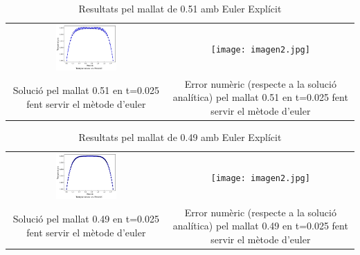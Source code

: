 \documentclass{article}
\begin{document}
\begin{table}[h]
    \centering
    \caption{Resultats pel mallat de 0.51 amb Euler Explícit}
    \label{tab:euler_at1}
    \begin{tabular}{cc}
        \includegraphics[width=0.4\textwidth]{images/T_vs_z_at1.png} &
        \texttt{[image: imagen2.jpg]} \\
        
        \parbox{0.4\textwidth}{\centering Solució pel mallat 0.51 en t=0.025 fent servir el mètode d'euler} &
        \parbox{0.4\textwidth}{\centering Error numèric (respecte a la solució analítica) pel mallat 0.51 en t=0.025 fent servir el mètode d'euler} \\
 
    \end{tabular}
\end{table}
\begin{table}[h]
    \centering
    \caption{Resultats pel mallat de 0.49 amb Euler Explícit}
    \label{tab:euler_at1}
    \begin{tabular}{cc}
        \includegraphics[width=0.4\textwidth]{images/T_vs_z_at2.png} &
        \texttt{[image: imagen2.jpg]} \\
        
        \parbox{0.4\textwidth}{\centering Solució pel mallat 0.49 en t=0.025 fent servir el mètode d'euler} &
        \parbox{0.4\textwidth}{\centering Error numèric (respecte a la solució analítica) pel mallat 0.49 en t=0.025 fent servir el mètode d'euler} \\
 
    \end{tabular}
\end{table}
\end{document}
